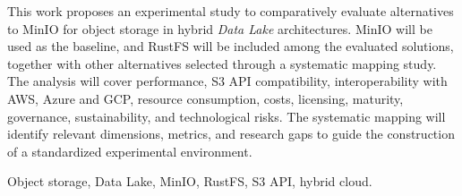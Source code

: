 This work proposes an experimental study to comparatively evaluate alternatives
to MinIO for object storage in hybrid \textit{Data Lake} architectures. MinIO
will be used as the baseline, and RustFS will be included among the evaluated
solutions, together with other alternatives selected through a systematic
mapping study. The analysis will cover performance, S3 API compatibility,
interoperability with AWS, Azure and GCP, resource consumption, costs, licensing,
maturity, governance, sustainability, and technological risks. The systematic
mapping will identify relevant dimensions, metrics, and research gaps to guide
the construction of a standardized experimental environment.

\begin{keywords}
Object storage, Data Lake, MinIO, RustFS, S3 API, hybrid cloud.
\end{keywords}
